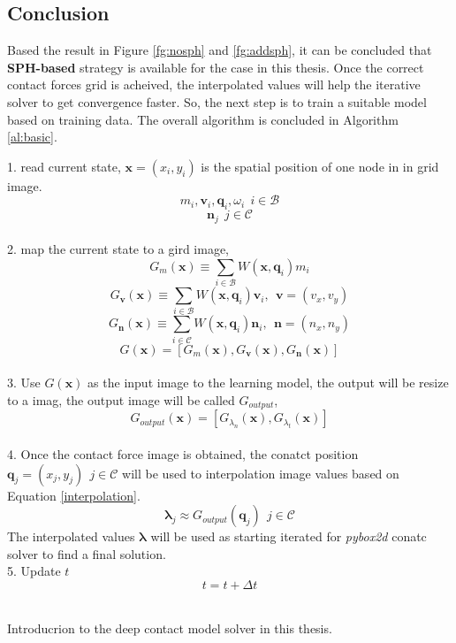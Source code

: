\subsection{Conclusion}
    Based the result in Figure \ref{fg:nosph} and \ref{fg:addsph}, it can be concluded that \textbf{SPH-based} strategy is available for the case in this thesis. Once the correct contact forces grid is acheived, the interpolated values will help the iterative solver to get convergence faster. So, the next step is to train a suitable model based on training data. The overall algorithm is concluded in Algorithm \ref{al:basic}.
    \begin{algorithm}[!h]
        {
            1. read current state, $\mathbf{x}=(x_i, y_i)$ is the spatial position of one node in in grid image.
                $$m_i, \pmb{v}_i, \pmb{q}_i, \omega_{i}~~i\in\mathcal{B}$$
                $$\pmb{n}_j~~j\in\mathcal{C}$$ \\
            2. map the current state to a gird image,
                $$G_{m}(\mathbf{x}) \equiv \sum_{i\in \mathcal{B}}W(\mathbf{x}, \pmb{q}_{i})m_i$$ 
                $$G_{\pmb{v}}(\mathbf{x}) \equiv \sum_{i\in \mathcal{B}}W(\mathbf{x}, \pmb{q}_{i})\pmb{v}_i,~~\pmb{v}=(v_x, v_y)$$
                $$G_{\pmb{n}}(\mathbf{x}) \equiv \sum_{i\in\mathcal{C}}W(\mathbf{x}, \pmb{q}_{i})\pmb{n}_{i},~~\pmb{n}=(n_x,n_y)$$
                $$G(\mathbf{x}) = [G_{m}(\mathbf{x}), G_{\pmb{v}}(\mathbf{x}), G_{\pmb{n}}(\mathbf{x})]$$ \\
            3. Use $G(\mathbf{x})$ as the input image to the learning model, the output will be resize to a imag, the output image will be called $G_{output}$,
                $$G_{output}(\mathbf{x}) = [G_{\lambda_{n}}(\mathbf{x}), G_{{\lambda}_{t}}(\mathbf{x})]$$ \\
            4. Once the contact force image is obtained,  the conatct position $\pmb{q}_{j} = (x_{j}, y_{j})~~j\in\mathcal{C}$  will be used to interpolation image values based on Equation \ref{interpolation}.
                $$\pmb{\lambda}_j \approx G_{output}(\pmb{q}_j)~~j\in\mathcal{C}$$ 
            The interpolated values $\pmb{\lambda}$ will be used as starting iterated for \textit{pybox2d} conatc solver to find a final solution. \\
            5. Update $t$
                $$t = t + \Delta t$$ \\
        }
        \caption{Introducrion to the deep contact model solver in this thesis.}
        \label{al:basic}
    \end{algorithm}

